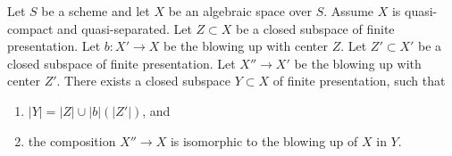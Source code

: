 \begin{lemma}
\label{lemma-composition-finite-type-blowups}
Let $S$ be a scheme and let $X$ be an algebraic space over $S$.
Assume $X$ is quasi-compact and quasi-separated.
Let $Z \subset X$ be a closed subspace of finite presentation.
Let $b : X' \to X$ be the blowing up with center $Z$.
Let $Z' \subset X'$ be a closed subspace of finite presentation.
Let $X'' \to X'$ be the blowing up with center $Z'$.
There exists a closed subspace $Y \subset X$ of finite presentation,
such that
\begin{enumerate}
\item $|Y| = |Z| \cup |b|(|Z'|)$, and
\item the composition $X'' \to X$ is isomorphic to the blowing up
of $X$ in $Y$.
\end{enumerate}
\end{lemma}

